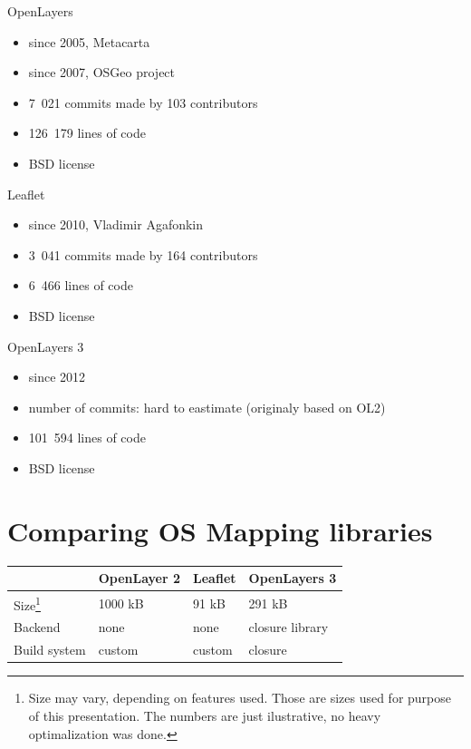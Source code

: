 \documentclass[xcolor=dvipsnames]{beamer}
\begin{document}
\begin{frame}{OpenLayers}
\begin{itemize}
    \item since 2005, Metacarta
    \item since 2007, OSGeo project
    \item 7~021 commits made by 103 contributors 
    \item 126~179 lines of code
    \item BSD license
\end{itemize}
\end{frame}

\begin{frame}{Leaflet}
\begin{itemize}
    \item since 2010, Vladimir Agafonkin
    \item 3~041 commits made by 164 contributors 
    \item 6~466 lines of code
    \item BSD license
\end{itemize}
\end{frame}

\begin{frame}{OpenLayers 3}
\begin{itemize}
    \item since 2012
    \item number of commits: hard to eastimate (originaly based on OL2)
    \item 101~594 lines of code
    \item BSD license
\end{itemize}
\end{frame}

\section{Comparing OS Mapping libraries}
\begin{frame}
\begin{center}
    \begin{tabular}{| l || l | l | l |}
        \hline
        \rowcolor{Gray}     & OpenLayer 2  & Leaflet & OpenLayers 3 \\
        \hline 
        \hline 
        Size\footnote{Size may vary, depending on features used. Those are sizes
        used for purpose of this presentation. The numbers are just ilustrative,
    no heavy optimalization was done.} & 1000 kB & 91 kB & 291 kB \\
        \hline
        Backend & none & none & closure library\\
        \hline
        Build system & custom & custom & closure \\
        \hline
    \end{tabular}
\end{center}
\end{frame}
\end{document}
